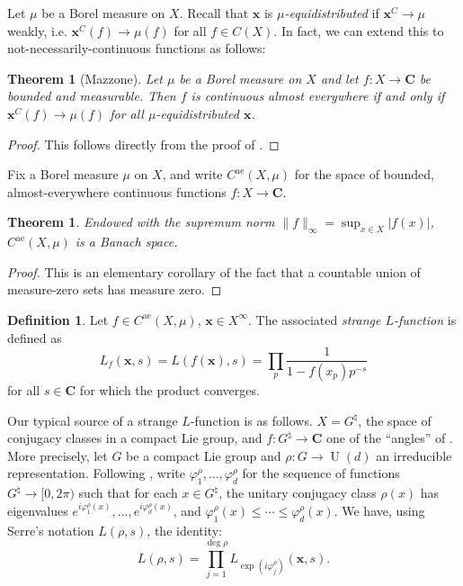 \documentclass{article}
\DeclareMathOperator{\U}{U}
\newcommand{\bC}{\mathbf{C}}
\newcommand{\bx}{{\boldsymbol x}}
\newcommand{\alev}{\mathrm{ae}}
\newtheorem{theorem}[subsection]{Theorem}
\theoremstyle{definition}
\newtheorem{definition}[subsection]{Definition}
\begin{document}
Let $\mu$ be a Borel measure on $X$. Recall that $\bx$ is 
\emph{$\mu$-equidistributed} if $\bx^C\to \mu$ weakly, i.e. 
$\bx^C(f) \to \mu(f)$ for all $f\in C(X)$. In fact, we can extend this to 
not-necessarily-continuous functions as follows:

\begin{theorem}[Mazzone]
Let $\mu$ be a Borel measure on $X$ and let $f\colon X\to \bC$ be bounded and 
measurable. Then $f$ is continuous almost everywhere if and only if 
$\bx^C(f) \to \mu(f)$ for all $\mu$-equidistributed $\bx$. 
\end{theorem}
\begin{proof}
This follows directly from the proof of \cite[Th.~1]{mazzone-1995}.
\end{proof}

Fix a Borel measure $\mu$ on $X$, and write $C^\alev(X,\mu)$ for the space of 
bounded, almost-everywhere continuous functions $f\colon X\to \bC$. 


\begin{theorem}
Endowed with the supremum norm $\|f\|_\infty=\sup_{x\in X} |f(x)|$, 
$C^\alev(X,\mu)$ is a Banach space. 
\end{theorem}
\begin{proof}
This is an elementary corollary of the fact that a countable union of 
measure-zero sets has measure zero. 
\end{proof}

\begin{definition}
Let $f\in C^\alev(X,\mu)$, $\bx\in X^\infty$. The associated \emph{strange 
$L$-function} is defined as 
\[
	L_f(\bx,s) = L(f(\bx),s) = \prod_p \frac{1}{1-f(x_p) p^{-s}} 
\]
for all $s\in \bC$ for which the product converges. 
\end{definition}

Our typical source of a strange $L$-function is as follows. $X=G^\natural$, the 
space of conjugacy classes in a compact Lie group, and 
$f\colon G^\natural\to \bC$ one of the ``angles'' of \cite{katz-sarnak-1999}. 
More precisely, let $G$ be a compact Lie group and $\rho\colon G\to \U(d)$ an 
irreducible representation. Following \cite[Le.~1.0.9]{katz-sarnak-1999}, write 
$\varphi_1^\rho,\dots,\varphi_d^\rho$ for the sequence of functions 
$G^\natural\to [0,2\pi)$ such that for each $x\in G^\natural$, the unitary 
conjugacy class $\rho(x)$ has eigenvalues 
$e^{i\varphi_1^\rho(x)},\dots,e^{i \varphi_d^\rho(x)}$, and 
$\varphi_1^\rho(x) \leqslant \cdots \leqslant \varphi_d^\rho(x)$. We have, 
using Serre's notation $L(\rho,s)$, the identity:
\[
	L(\rho,s) = \prod_{j=1}^{\deg\rho} L_{\exp(i\varphi_j^\rho)}(\bx,s) .
\]
\end{document}
